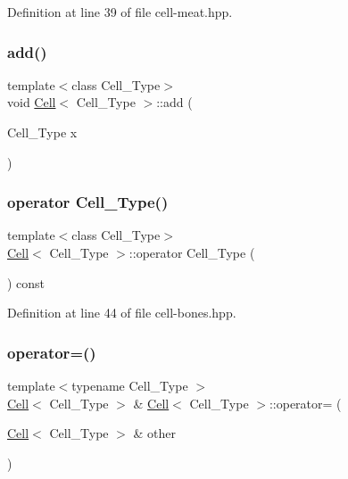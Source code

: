 Definition at line 39 of file cell-\/meat.\+hpp.

\mbox{\label{class_cell_a3d063afd2a8743623d0e524debbd55e9}} 
\subsubsection{\texorpdfstring{add()}{add()}\hspace{0.1cm}{\footnotesize\ttfamily [9/9]}}
{\footnotesize\ttfamily template$<$class Cell\+\_\+\+Type$>$ \\
void \hyperlink{class_cell}{Cell}$<$ Cell\+\_\+\+Type $>$\+::add (\begin{DoxyParamCaption}\item[{Cell\+\_\+\+Type}]{x }\end{DoxyParamCaption})}

\mbox{\label{class_cell_abe9b289bc80d4f5d0717ba9e69197c0b}} 
\subsubsection{\texorpdfstring{operator Cell\+\_\+\+Type()}{operator Cell\_Type()}}
{\footnotesize\ttfamily template$<$class Cell\+\_\+\+Type$>$ \\
\hyperlink{class_cell}{Cell}$<$ Cell\+\_\+\+Type $>$\+::operator Cell\+\_\+\+Type (\begin{DoxyParamCaption}{ }\end{DoxyParamCaption}) const\hspace{0.3cm}{\ttfamily [inline]}}



Definition at line 44 of file cell-\/bones.\+hpp.

\mbox{\label{class_cell_a6cfdc588dba9ca10a11693d644ac0c60}} 
\subsubsection{\texorpdfstring{operator=()}{operator=()}\hspace{0.1cm}{\footnotesize\ttfamily [1/2]}}
{\footnotesize\ttfamily template$<$typename Cell\+\_\+\+Type $>$ \\
\hyperlink{class_cell}{Cell}$<$ Cell\+\_\+\+Type $>$ \& \hyperlink{class_cell}{Cell}$<$ Cell\+\_\+\+Type $>$\+::operator= (\begin{DoxyParamCaption}\item[{\hyperlink{class_cell}{Cell}$<$ Cell\+\_\+\+Type $>$ \&}]{other }\end{DoxyParamCaption})}



